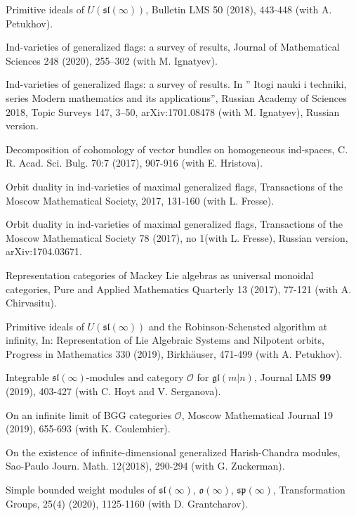 \documentclass[11pt]{amsart}
\begin{document}
\myss \label{71.}  Primitive ideals of $U(\mathfrak{sl}(\infty))$, Bulletin LMS 50 (2018), 443-448 (with A. Petukhov).

\myss \label{72.}  Ind-varieties of generalized flags: a survey of results, Journal of Mathematical Sciences 248 (2020), 255–302 (with M. Ignatyev).

\myss \label{72'.} Ind-varieties of generalized flags: a survey of results. In '' Itogi nauki i techniki, series Modern mathematics and its applications'',  Russian Academy of Sciences 2018, Topic Surveys 147, 3--50, arXiv:1701.08478 (with M. Ignatyev), Russian version.

\myss \label{73.} Decomposition of cohomology of vector bundles on homogeneous ind-spaces, C. R. Acad. Sci. Bulg. 70:7 (2017), 907-916 (with E. Hristova).

\myss \label{74.} Orbit duality in ind-varieties of maximal generalized flags, Transactions of the Moscow Mathematical Society, 2017, 131-160 (with L. Fresse).

\myss \label{74'.} Orbit duality in ind-varieties of maximal generalized flags, Transactions of the Moscow Mathematical Society 78 (2017), no 1(with L. Fresse), Russian version, arXiv:1704.03671.

\myss \label{75.} Representation categories of Mackey Lie algebras as universal monoidal categories, Pure and Applied Mathematics Quarterly 13 (2017), 77-121 (with A. Chirvasitu).

\myss \label{76.} Primitive ideals of $U(\mathfrak{sl}(\infty))$ and the Robinson-Schensted algorithm at infinity, In: Representation of Lie Algebraic Systems and Nilpotent orbits, Progress in Mathematics 330 (2019), Birkhäuser, 471-499 (with A. Petukhov).

\myss \label{77.} Integrable $\mathfrak{sl}(\infty)$-modules and category $\mathcal O$ for $\mathfrak{gl}(m|n)$, Journal LMS \textbf{99} (2019), 403-427 (with C. Hoyt and V. Serganova).

\myss \label{78.} On an infinite	limit of BGG categories $\mathcal O$, Moscow Mathematical Journal 19 (2019), 655-693 (with K. Coulembier).

\myss \label{79.} On the existence of infinite-dimensional generalized Harish-Chandra modules, Sao-Paulo Journ. Math. 12(2018), 290-294 (with G. Zuckerman).

\myss \label{80.} Simple bounded weight modules of $\mathfrak{sl}(\infty)$, $\mathfrak{o}(\infty)$, $\mathfrak{sp}(\infty)$, Transformation Groups, 25(4) (2020), 1125-1160 (with D. Grantcharov).
\end{document}
